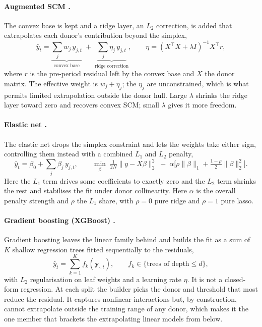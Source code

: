 \paragraph{Augmented SCM \citep{benmichael2021}.} The convex base is kept and a ridge layer, an
$L_2$ correction, is added that extrapolates each donor's contribution beyond the simplex,
\begin{equation}
\hat y_t = \underbrace{\sum_j w_j\, y_{j,t}}_{\text{convex base}}
\;+\; \underbrace{\sum_j \eta_j\, y_{j,t}}_{\text{ridge correction}},
\qquad \eta = (X^\top X + \lambda I)^{-1} X^\top r,
\label{eq:ascm}
\end{equation}
where $r$ is the pre-period residual left by the convex base and $X$ the donor matrix. The
effective weight is $w_j+\eta_j$; the $\eta_j$ are unconstrained, which is what permits limited
extrapolation outside the donor hull. Large $\lambda$ shrinks the ridge layer toward zero and
recovers convex SCM; small $\lambda$ gives it more freedom.

\paragraph{Elastic net \citep{doudchenko2016,zouhastie2005}.} The elastic net drops the simplex
constraint and lets the weights take either sign, controlling them instead with a combined
$L_1$ and $L_2$ penalty,
\begin{equation}
\hat y_t = \beta_0 + \sum_j \beta_j\, y_{j,t}, \qquad
\min_\beta \;\tfrac{1}{2N}\lVert y - X\beta\rVert_2^2
\;+\; \alpha\Big[\rho\lVert\beta\rVert_1 + \tfrac{1-\rho}{2}\lVert\beta\rVert_2^2\Big].
\label{eq:enet}
\end{equation}
Here the $L_1$ term drives some coefficients to exactly zero and the $L_2$ term
shrinks the rest and stabilises the fit under donor collinearity. Here $\alpha$ is the overall
penalty strength and $\rho$ the $L_1$ share, with $\rho=0$ pure ridge and $\rho=1$ pure lasso.

\paragraph{Gradient boosting (XGBoost) \citep{chenguestrin2016}.} Gradient boosting leaves the
linear family behind and builds the fit as a sum of $K$ shallow regression trees fitted
sequentially to the residuals,
\begin{equation}
\hat y_t = \sum_{k=1}^{K} f_k(\mathbf{y}_{\cdot,t}),
\qquad f_k \in \{\text{trees of depth} \le d\},
\label{eq:xgb}
\end{equation}
with $L_2$ regularisation on leaf weights and a learning rate $\eta$. It is not a closed-form
regression. At each split the builder picks the donor and threshold that most reduce the
residual. It captures nonlinear interactions but, by construction, cannot extrapolate outside
the training range of any donor, which makes it the one member that brackets the extrapolating
linear models from below.

